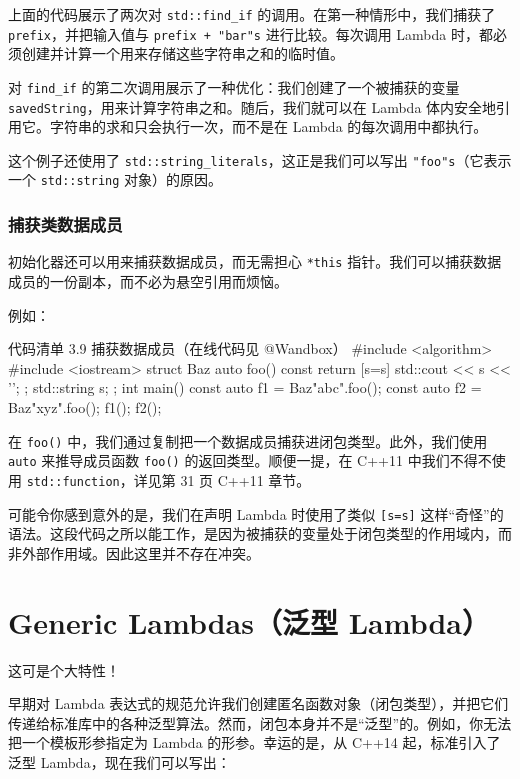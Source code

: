 上面的代码展示了两次对 \texttt{std::find\_if} 的调用。在第一种情形中，我们捕获了 \texttt{prefix}，并把输入值与 \texttt{prefix + "bar"s} 进行比较。每次调用 Lambda 时，都必须创建并计算一个用来存储这些字符串之和的临时值。

对 \texttt{find\_if} 的第二次调用展示了一种优化：我们创建了一个被捕获的变量 \texttt{savedString}，用来计算字符串之和。随后，我们就可以在 Lambda 体内安全地引用它。字符串的求和只会执行一次，而不是在 Lambda 的每次调用中都执行。

这个例子还使用了 \texttt{std::string\_literals}，这正是我们可以写出 \texttt{"foo"s}（它表示一个 \texttt{std::string} 对象）的原因。

\subsubsection{捕获类数据成员}

初始化器还可以用来捕获数据成员，而无需担心 \texttt{*this} 指针。我们可以捕获数据成员的一份副本，而不必为悬空引用而烦恼。

例如：

\begin{codeboxt}{代码清单 3.9 捕获数据成员（在线代码见 @Wandbox）}
#include <algorithm>
#include <iostream>
struct Baz {
auto foo() const {
return [s=s] { std::cout << s << '\n'; };
}
std::string s;
};
int main() {
const auto f1 = Baz{"abc"}.foo();
const auto f2 = Baz{"xyz"}.foo();
f1();
f2();
}
\end{codeboxt}

在 \texttt{foo()} 中，我们通过复制把一个数据成员捕获进闭包类型。此外，我们使用 \texttt{auto} 来推导成员函数 \texttt{foo()} 的返回类型。顺便一提，在 C++11 中我们不得不使用 \texttt{std::function}，详见第 31 页 C++11 章节。

可能令你感到意外的是，我们在声明 Lambda 时使用了类似 \texttt{[s=s]} 这样“奇怪”的语法。这段代码之所以能工作，是因为被捕获的变量处于闭包类型的作用域内，而非外部作用域。因此这里并不存在冲突。

\section{Generic Lambdas（泛型 Lambda）}

这可是个大特性！

早期对 Lambda 表达式的规范允许我们创建匿名函数对象（闭包类型），并把它们传递给标准库中的各种泛型算法。然而，闭包本身并不是“泛型”的。例如，你无法把一个模板形参指定为 Lambda 的形参。幸运的是，从 C++14 起，标准引入了泛型 Lambda，现在我们可以写出：

